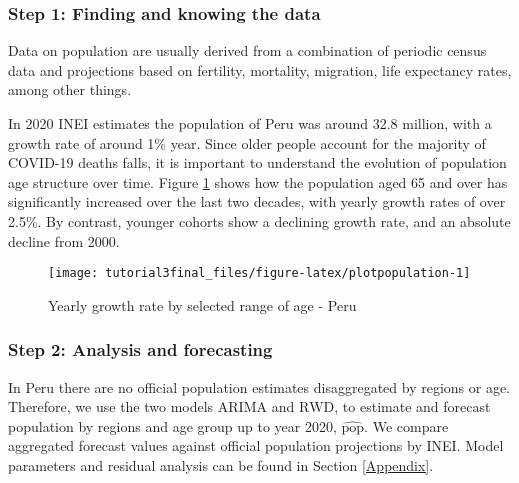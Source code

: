 \documentclass[
]{article}
\begin{document}
\hypertarget{step-1-finding-and-knowing-the-data}{%
\subsubsection{Step 1: Finding and knowing the data}\label{step-1-finding-and-knowing-the-data}}

Data on population are usually derived from a combination of periodic census data and projections based on fertility, mortality, migration, life expectancy rates, among other things.

In 2020 INEI estimates the population of Peru was around 32.8 million, with a growth rate of around 1\% year. Since older people account for the majority of COVID-19 deaths falls, it is important to understand the evolution of population age structure over time. Figure \ref{fig:plotpopulation} shows how the population aged 65 and over has significantly increased over the last two decades, with yearly growth rates of over 2.5\%. By contrast, younger cohorts show a declining growth rate, and an absolute decline from 2000.

\begin{figure}[H]

{\centering \texttt{[image: tutorial3final\_files/figure-latex/plotpopulation-1]} 

}

\caption{Yearly growth rate by selected range of age - Peru}\label{fig:plotpopulation}
\end{figure}

\hypertarget{step-2-analysis-and-forecasting}{%
\subsubsection{Step 2: Analysis and forecasting}\label{step-2-analysis-and-forecasting}}

In Peru there are no official population estimates disaggregated by regions or age. Therefore, we use the two models \(\text{ARIMA}\) and \(\text{RWD}\), to estimate and forecast population by regions and age group up to year 2020, \(\widehat{\text{pop}}\). We compare aggregated forecast values against official population projections by INEI. Model parameters and residual analysis can be found in Section \ref{Appendix}.
\end{document}
